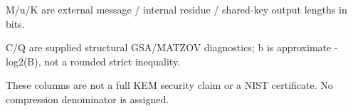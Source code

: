 \begin{table}[t]
\centering
\caption{Primary family parameters and attributed diagnostics}
\label{tab:primary-parameters}
\begin{minipage}{\textwidth}\footnotesize
M/u/K are external message / internal residue / shared-key output lengths in bits.\par
C/Q are supplied structural GSA/MATZOV diagnostics; b is approximate -log2(B), not a rounded strict inequality.\par
These columns are not a full KEM security claim or a NIST certificate. No compression denominator is assigned.\par
\end{minipage}
\end{table}
